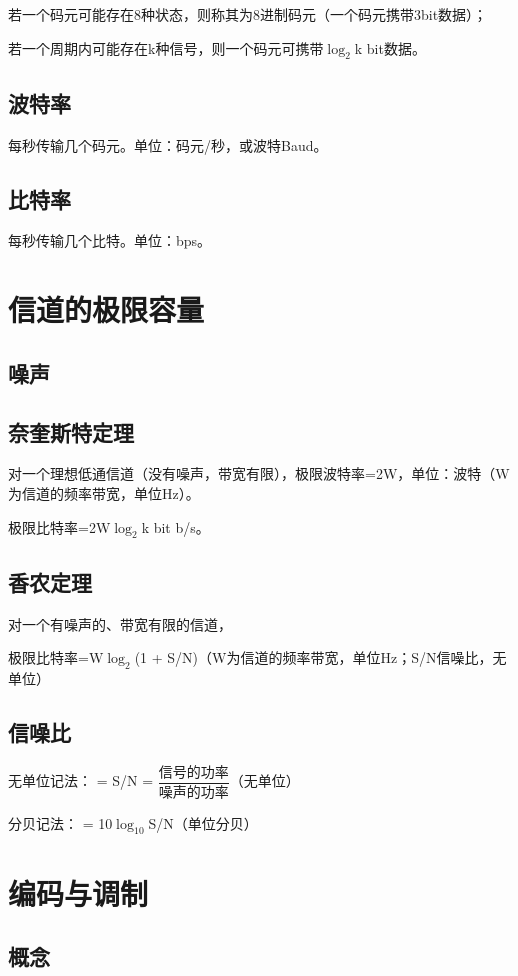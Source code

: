 若一个码元可能存在8种状态，则称其为8进制码元（一个码元携带3bit数据）；

若一个周期内可能存在k种信号，则一个码元可携带\(\log_2\)k bit数据。


\subsection{波特率}
每秒传输几个码元。单位：码元/秒，或波特Baud。


\subsection{比特率}
每秒传输几个比特。单位：bps。


\section{信道的极限容量}

\subsection{噪声}


\subsection{奈奎斯特定理}
对一个理想低通信道（没有噪声，带宽有限），极限波特率=2W，单位：波特（W为信道的频率带宽，单位Hz）。

极限比特率=2W\(\log_2\)k bit b/s。


\subsection{香农定理}
对一个有噪声的、带宽有限的信道，

极限比特率=W\(\log_2\)(1 + S/N)（W为信道的频率带宽，单位Hz；S/N信噪比，无单位）


\subsection{信噪比}
无单位记法： = S/N = \(\dfrac{\text{信号的功率}}{\text{噪声的功率}}\)（无单位）

分贝记法： = 10\(\log_{10}\)S/N（单位分贝）


\section{编码与调制}

\subsection{概念}


